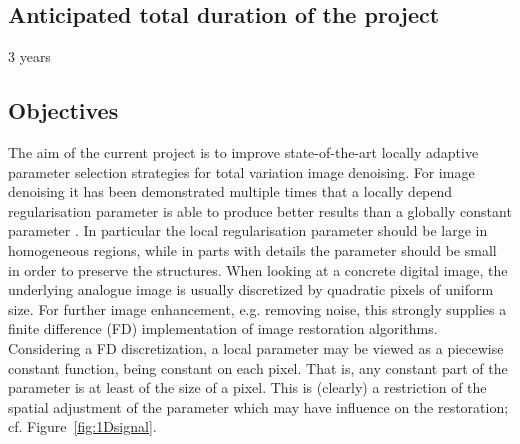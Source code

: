 \documentclass[enabledeprecatedfontcommands,cleardoublepage=empty,headsepline,twoside,11pt,DIV=15,BCOR=12mm,final]{scrartcl}
\newcommand{\newf}[1]{}%
\begin{document}
%


\subsection{Anticipated total duration of the project}
\label{sec:duration}

3 years

\subsection{Objectives}\label{sec:Objectives}

The aim of the current project is to improve state-of-the-art locally adaptive parameter selection strategies for total variation image denoising. %
For image denoising it has been demonstrated multiple times that a locally depend regularisation parameter is able to produce better results than a globally constant parameter \cite{}. In particular the local regularisation parameter should be large in homogeneous regions, while in parts with details the parameter should be small in order to preserve the structures. When looking at a concrete digital image, the underlying analogue image is usually discretized by quadratic pixels of uniform size. For further image enhancement, e.g. removing noise, this strongly supplies a finite difference (FD) implementation of image restoration algorithms. Considering a FD discretization, a local parameter may be viewed as a piecewise constant function, being constant on each pixel. That is, any constant part of the parameter is at least of the size of a pixel. This is (clearly) a restriction of the spatial adjustment of the parameter which may have influence on the restoration; cf. Figure~\ref{fig:1Dsignal}.
\end{document}
